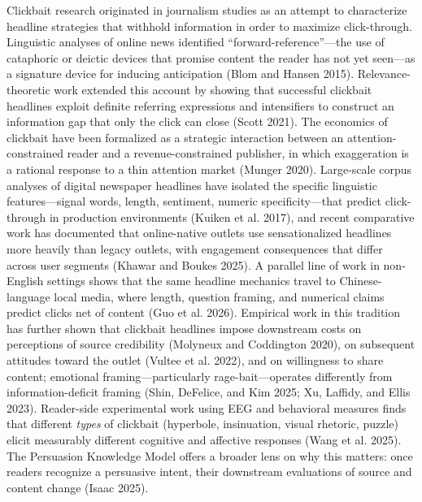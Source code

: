 \documentclass[
  12pt,
]{article}
\begin{document}
Clickbait research originated in journalism studies as an attempt to
characterize headline strategies that withhold information in order to
maximize click-through. Linguistic analyses of online news identified
``forward-reference''---the use of cataphoric or deictic devices that
promise content the reader has not yet seen---as a signature device for
inducing anticipation (Blom and Hansen 2015). Relevance-theoretic work
extended this account by showing that successful clickbait headlines
exploit definite referring expressions and intensifiers to construct an
information gap that only the click can close (Scott 2021). The
economics of clickbait have been formalized as a strategic interaction
between an attention-constrained reader and a revenue-constrained
publisher, in which exaggeration is a rational response to a thin
attention market (Munger 2020). Large-scale corpus analyses of digital
newspaper headlines have isolated the specific linguistic
features---signal words, length, sentiment, numeric specificity---that
predict click-through in production environments (Kuiken et al. 2017),
and recent comparative work has documented that online-native outlets
use sensationalized headlines more heavily than legacy outlets, with
engagement consequences that differ across user segments (Khawar and
Boukes 2025). A parallel line of work in non-English settings shows that
the same headline mechanics travel to Chinese-language local media,
where length, question framing, and numerical claims predict clicks net
of content (Guo et al. 2026). Empirical work in this tradition has
further shown that clickbait headlines impose downstream costs on
perceptions of source credibility (Molyneux and Coddington 2020), on
subsequent attitudes toward the outlet (Vultee et al. 2022), and on
willingness to share content; emotional framing---particularly
rage-bait---operates differently from information-deficit framing (Shin,
DeFelice, and Kim 2025; Xu, Laffidy, and Ellis 2023). Reader-side
experimental work using EEG and behavioral measures finds that different
\emph{types} of clickbait (hyperbole, insinuation, visual rhetoric,
puzzle) elicit measurably different cognitive and affective responses
(Wang et al. 2025). The Persuasion Knowledge Model offers a broader lens
on why this matters: once readers recognize a persuasive intent, their
downstream evaluations of source and content change (Isaac 2025).
\end{document}
